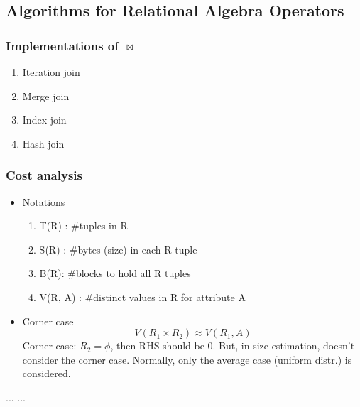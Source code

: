 \documentclass{article}
\begin{document}
\subsection{Algorithms for Relational Algebra Operators}
\subsubsection{Implementations of $\bowtie$}
\begin{enumerate}
\item Iteration join
\item Merge join 
\item Index join 
\item Hash join 
\end{enumerate}
\subsubsection{Cost analysis}
\begin{itemize}
\item Notations
\begin{enumerate}
\item T(R) : #tuples in R
\item S(R) : #bytes (size) in each R tuple
\item B(R): #blocks to hold all R tuples 
\item V(R, A) : #distinct values in R for attribute A
\end{enumerate}
\item Corner case 
$$
V(R_1\times R_2) \approx V(R_1, A)
$$
Corner case: $R_2=\phi$, then RHS should be 0. But, in size estimation, doesn't consider the corner case. Normally, only the average case (uniform distr.) is considered. 
\end{itemize}



\begin{thebibliography}{99}
 ...
 ...
\end{thebibliography}
\end{document}
